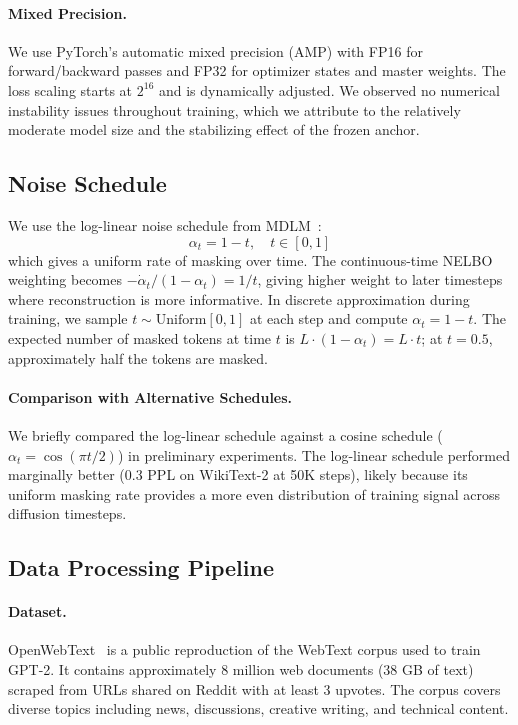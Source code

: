 \paragraph{Mixed Precision.} We use PyTorch's automatic mixed precision (AMP) with FP16 for forward/backward passes and FP32 for optimizer states and master weights. The loss scaling starts at $2^{16}$ and is dynamically adjusted. We observed no numerical instability issues throughout training, which we attribute to the relatively moderate model size and the stabilizing effect of the frozen anchor.

\subsection{Noise Schedule}

We use the log-linear noise schedule from MDLM~\citep{mdlm}:
\begin{equation}
    \alpha_t = 1 - t, \quad t \in [0, 1]
\end{equation}
which gives a uniform rate of masking over time. The continuous-time NELBO weighting becomes $-\dot\alpha_t/(1{-}\alpha_t) = 1/t$, giving higher weight to later timesteps where reconstruction is more informative. In discrete approximation during training, we sample $t \sim \text{Uniform}[0, 1]$ at each step and compute $\alpha_t = 1 - t$. The expected number of masked tokens at time $t$ is $L \cdot (1 - \alpha_t) = L \cdot t$; at $t = 0.5$, approximately half the tokens are masked.

\paragraph{Comparison with Alternative Schedules.} We briefly compared the log-linear schedule against a cosine schedule ($\alpha_t = \cos(\pi t / 2)$) in preliminary experiments. The log-linear schedule performed marginally better (0.3 PPL on WikiText-2 at 50K steps), likely because its uniform masking rate provides a more even distribution of training signal across diffusion timesteps.

\subsection{Data Processing Pipeline}

\paragraph{Dataset.} OpenWebText~\citep{owt} is a public reproduction of the WebText corpus used to train GPT-2. It contains approximately 8 million web documents (38 GB of text) scraped from URLs shared on Reddit with at least 3 upvotes. The corpus covers diverse topics including news, discussions, creative writing, and technical content.

